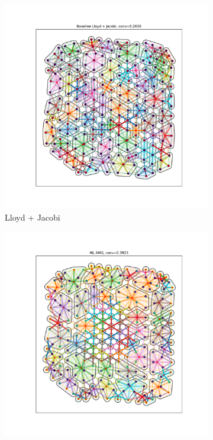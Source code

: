 \documentclass{article}
\begin{document}
\begin{figure}[h]
  \centering
  \begin{subfigure}[t]{0.32\textwidth}
    \centering
    \includegraphics[width=\textwidth, trim=80 70 70 50, clip]{grid_700_lloyd.pdf}
    \caption{Lloyd + Jacobi}
  \end{subfigure}
  \begin{subfigure}[t]{0.32\textwidth}
    \centering
    \includegraphics[width=\textwidth, trim=80 70 70 50, clip]{grid_700_ml.pdf}

\end{subfigure}
\end{figure}
\end{document}

